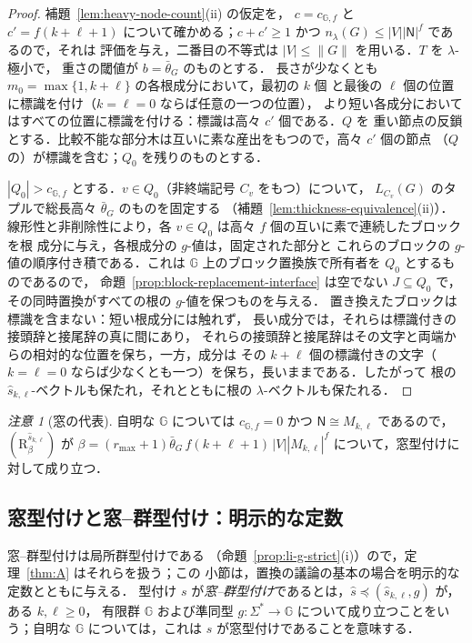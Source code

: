 \documentclass[11pt,a4paper]{ltjsarticle}
\numberwithin{equation}{section}
\theoremstyle{plain}
\theoremstyle{definition}
\theoremstyle{remark}
\newtheorem{remark}[theorem]{注意}
\theoremstyle{plain}
\begin{document}
\begin{proof}
補題~\ref{lem:heavy-node-count}(ii) の仮定を，
$c=c_{{\mathbb G},f}$ と $c'=f(k+\ell+1)$ について確かめる；$c+c'\ge1$ かつ $n_\lambda(G)\le|V||\mathsf N|^f$ であるので，それは
評価を与え，二番目の不等式は $|V|\le\|G\|$ を用いる．$T$ を $\lambda$-極小で，
重さの閾値が $b=\bar\theta_G$ のものとする．
長さが少なくとも $m_0=\max\{1,k+\ell\}$ の各根成分において，最初の $k$ 個
と最後の $\ell$ 個の位置に標識を付け（$k=\ell=0$ ならば任意の一つの位置），
より短い各成分においてはすべての位置に標識を付ける：標識は高々 $c'$ 個である．$Q$ を
重い節点の反鎖とする．比較不能な部分木は互いに素な産出をもつので，高々 $c'$ 個の節点
（$Q$ の）が標識を含む；$Q_0$ を残りのものとする．

$|Q_0|>c_{{\mathbb G},f}$ とする．$v\in Q_0$（非終端記号 $C_v$ をもつ）について，
$L_{C_v}(G)$ のタプルで総長高々 $\bar\theta_G$ のものを固定する
（補題~\ref{lem:thickness-equivalence}(ii)）．線形性と非削除性により，各
$v\in Q_0$ は高々 $f$ 個の互いに素で連続したブロックを根
成分に与え，各根成分の $g$-値は，固定された部分と
これらのブロックの $g$-値の順序付き積である．これは
${\mathbb G}$ 上のブロック置換族で所有者を $Q_0$ とするものであるので，
命題~\ref{prop:block-replacement-interface} は空でない
$J\subseteq Q_0$ で，その同時置換がすべての根の $g$-値を保つものを与える．
置き換えたブロックは標識を含まない：短い根成分には触れず，
長い成分では，それらは標識付きの接頭辞と接尾辞の真に間にあり，
それらの接頭辞と接尾辞はその文字と両端からの相対的な位置を保ち，一方，成分は
その $k+\ell$ 個の標識付きの文字（$k=\ell=0$ ならば少なくとも一つ）を保ち，長いままである．したがって
根の $\widehat s_{k,\ell}$-ベクトルも保たれ，それとともに根の
$\lambda$-ベクトルも保たれる．
\end{proof}

\begin{remark}[窓の代表]
\label{lem:boundary-short-canonical}
自明な ${\mathbb G}$ については $c_{{\mathbb G},f}=0$ かつ $\mathsf N\cong M_{k,\ell}$ であるので，
$(\mathrm R_\beta^{\widehat s_{k,\ell}})$ が
$\beta=(r_{\max}+1)\bar\theta_G\,f(k+\ell+1)\,|V||M_{k,\ell}|^f$ について，窓型付けに対して成り立つ．
\end{remark}

\subsection{窓型付けと窓--群型付け：明示的な定数}
\label{subsec:boundary-polydata}

窓--群型付けは局所群型付けである
（命題~\ref{prop:li-g-strict}(i)）ので，定理~\ref{thm:A} はそれらを扱う；この
小節は，置換の議論の基本の場合を明示的な定数とともに与える．
型付け $s$ が\emph{窓--群型付け}であるとは，$\widehat s\preceq(\widehat s_{k,\ell},g)$ が，ある $k,\ell\ge0$，
有限群 ${\mathbb G}$ および準同型 $g:\Sigma^*\to{\mathbb G}$ について成り立つことをいう；自明な
${\mathbb G}$ については，これは $s$ が窓型付けであることを意味する．
\end{document}
